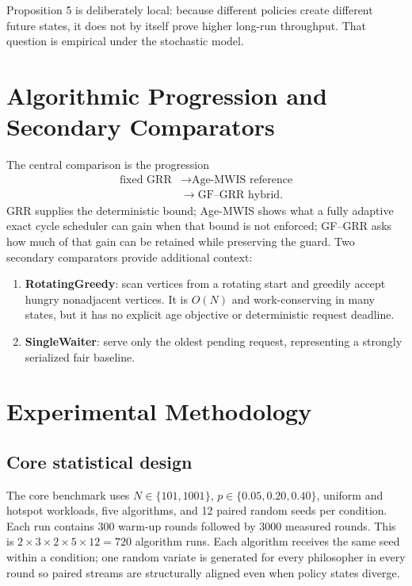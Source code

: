 \documentclass[10pt,journal]{IEEEtran}
\begin{document}
Proposition 5 is deliberately local: because different policies create different future states, it does not by itself prove higher long-run throughput. That question is empirical under the stochastic model.

\section{Algorithmic Progression and Secondary Comparators}
The central comparison is the progression 
\begin{equation}
\begin{aligned}
\text{fixed GRR} &\longrightarrow \text{Age-MWIS reference}\\
                 &\longrightarrow \text{GF--GRR hybrid}.
\end{aligned}
\end{equation}
GRR supplies the deterministic bound; Age-MWIS shows what a fully adaptive exact cycle scheduler can gain when that bound is not enforced; GF--GRR asks how much of that gain can be retained while preserving the guard. Two secondary comparators provide additional context:
\begin{enumerate}
\item \textbf{RotatingGreedy}: scan vertices from a rotating start and greedily accept hungry nonadjacent vertices. It is $O(N)$ and work-conserving in many states, but it has no explicit age objective or deterministic request deadline.
\item \textbf{SingleWaiter}: serve only the oldest pending request, representing a strongly serialized fair baseline.
\end{enumerate}

\section{Experimental Methodology}
\subsection{Core statistical design}
The core benchmark uses $N\in\{101,1001\}$, $p\in\{0.05,0.20,0.40\}$, uniform and hotspot workloads, five algorithms, and 12 paired random seeds per condition. Each run contains 300 warm-up rounds followed by 3000 measured rounds. This is $2\times3\times2\times5\times12=720$ algorithm runs. Each algorithm receives the same seed within a condition; one random variate is generated for every philosopher in every round so paired streams are structurally aligned even when policy states diverge.
\end{document}
